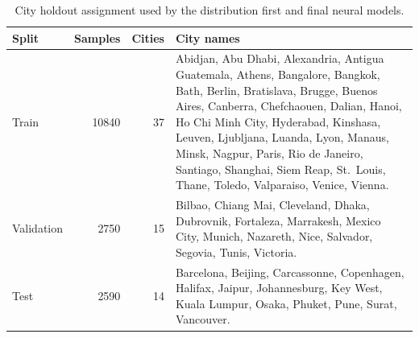 \documentclass[journal]{IEEEtran}
\begin{document}
\begin{table}[!t]
\centering
\caption{City holdout assignment used by the distribution first and final neural models.}
\label{tab:split-city-assignment}
\scriptsize
\setlength{\tabcolsep}{4pt}
\begin{tabularx}{\textwidth}{lrrX}
\toprule
Split & Samples & Cities & City names \\
\midrule
Train & 10840 & 37 & Abidjan, Abu Dhabi, Alexandria, Antigua Guatemala,
Athens, Bangalore, Bangkok, Bath, Berlin, Bratislava, Brugge, Buenos Aires,
Canberra, Chefchaouen, Dalian, Hanoi, Ho Chi Minh City, Hyderabad, Kinshasa,
Leuven, Ljubljana, Luanda, Lyon, Manaus, Minsk, Nagpur, Paris,
Rio de Janeiro, Santiago, Shanghai, Siem Reap, St.~Louis, Thane, Toledo,
Valparaiso, Venice, Vienna. \\
Validation & 2750 & 15 & Bilbao, Chiang Mai, Cleveland, Dhaka, Dubrovnik,
Fortaleza, Marrakesh, Mexico City, Munich, Nazareth, Nice, Salvador, Segovia,
Tunis, Victoria. \\
Test & 2590 & 14 & Barcelona, Beijing, Carcassonne, Copenhagen, Halifax,
Jaipur, Johannesburg, Key West, Kuala Lumpur, Osaka, Phuket, Pune, Surat,
Vancouver. \\
\bottomrule
\end{tabularx}
\end{table}
\end{document}
